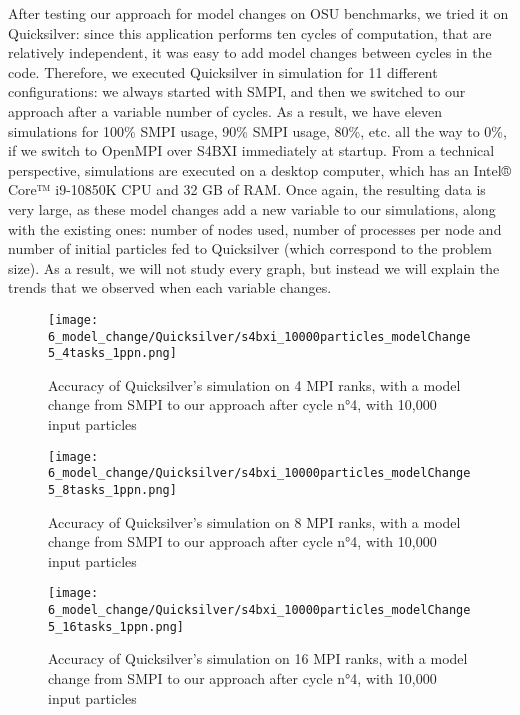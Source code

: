 After testing our approach for model changes on OSU benchmarks, we tried it on
Quicksilver: since this application performs ten cycles of computation, that are
relatively independent, it was easy to add model changes between cycles in the
code. Therefore, we executed Quicksilver in simulation for 11 different
configurations: we always started with SMPI, and then we switched to our
approach after a variable number of cycles. As a result, we have eleven
simulations for 100\% SMPI usage, 90\% SMPI usage, 80\%, etc. all the way to
0\%, if we switch to OpenMPI over S4BXI immediately at startup. From a technical
perspective, simulations are executed on a desktop computer, which has an Intel®
Core™ i9-10850K CPU and 32 GB of RAM. Once again, the resulting data is very
large, as these model changes add a new variable to our simulations, along with
the existing ones: number of nodes used, number of processes per node and number
of initial particles fed to Quicksilver (which correspond to the problem size).
As a result, we will not study every graph, but instead we will explain the
trends that we observed when each variable changes.

\begin{figure}[!ht]
    \centering
    \texttt{[image: 6\_model\_change/Quicksilver/s4bxi\_10000particles\_modelChange5\_4tasks\_1ppn.png]}
    \caption{Accuracy of Quicksilver's simulation on 4 MPI ranks, with a model change from SMPI to our approach after cycle n°4, with 10,000 input particles}
    \label{fig:6_model_change:quicksilver_4tasks_1ppn_accuracy}
\end{figure}

\begin{figure}[!ht]
    \centering
    \texttt{[image: 6\_model\_change/Quicksilver/s4bxi\_10000particles\_modelChange5\_8tasks\_1ppn.png]}
    \caption{Accuracy of Quicksilver's simulation on 8 MPI ranks, with a model change from SMPI to our approach after cycle n°4, with 10,000 input particles}
    \label{fig:6_model_change:quicksilver_8tasks_1ppn_accuracy}
\end{figure}

\begin{figure}[!ht]
    \centering
    \texttt{[image: 6\_model\_change/Quicksilver/s4bxi\_10000particles\_modelChange5\_16tasks\_1ppn.png]}
    \caption{Accuracy of Quicksilver's simulation on 16 MPI ranks, with a model change from SMPI to our approach after cycle n°4, with 10,000 input particles}
    \label{fig:6_model_change:quicksilver_16tasks_1ppn_accuracy}
\end{figure}

